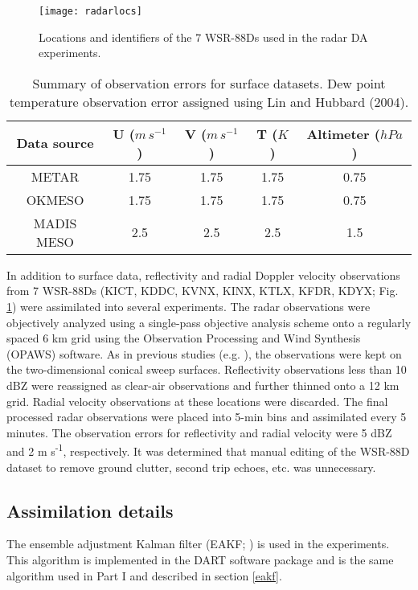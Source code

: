 \begin{figure}
\centering
\texttt{[image: radarlocs]}
\caption{Locations and identifiers of the 7 WSR-88Ds used in the radar DA experiments.}
\label{radarlocs}
\end{figure}

\begin{table}
\centering
\begin{tabular}{ c || c | c | c | c }
{\bf Data source} & {\bf U (\(m\,s^{-1}\))} & {\bf V (\(m\,s^{-1}\))} & {\bf T (\(K\))} & {\bf Altimeter (\(hPa\))} \\
\hline \hline
METAR & 1.75 & 1.75 & 1.75 & 0.75 \\
\hline
OKMESO & 1.75 & 1.75 & 1.75 & 0.75 \\
\hline
MADIS MESO & 2.5 & 2.5 & 2.5 & 1.5 \\
\end{tabular}
\caption{Summary of observation errors for surface datasets. Dew point temperature observation error assigned using Lin and Hubbard (2004).}
\label{errortable}
\end{table}

In addition to surface data, reflectivity and radial Doppler velocity observations from 7 WSR-88Ds (KICT, KDDC, KVNX, KINX, KTLX, KFDR, KDYX; Fig. \ref{radarlocs}) were assimilated into several experiments. The radar observations were objectively analyzed using a single-pass \citet{barnes64} objective analysis scheme onto a regularly spaced 6 km grid using the Observation Processing and Wind Synthesis (OPAWS) software. As in previous studies (e.g. \citealt{dowelletal04}), the observations were kept on the two-dimensional conical sweep surfaces. Reflectivity observations less than 10 dBZ were reassigned as clear-air observations and further thinned onto a 12 km grid. Radial velocity observations at these locations were discarded. The final processed radar observations were placed into 5-min bins and assimilated every 5 minutes. The observation errors for reflectivity and radial velocity were 5 dBZ and 2 m s\textsuperscript{-1}, respectively. It was determined that manual editing of the WSR-88D dataset to remove ground clutter, second trip echoes, etc. was unnecessary.

\subsection{Assimilation details}
The ensemble adjustment Kalman filter (EAKF; \citealt{anderson01,anderson03}) is used in the experiments. This algorithm is implemented in the DART software package and is the same algorithm used in Part I and described in section \ref{eakf}.

